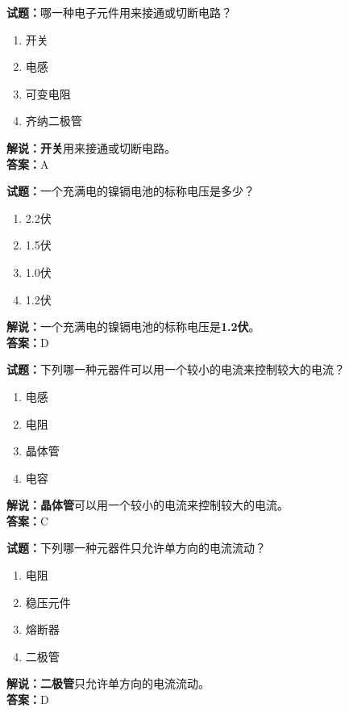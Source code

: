 \documentclass{ctexbook}
\begin{document}
\bigskip


\noindent\textbf{试题：}哪一种电子元件用来接通或切断电路？
\begin{enumerate}[leftmargin=3em]
\item 开关
\item 电感
\item 可变电阻
\item 齐纳二极管
\end{enumerate}
\noindent\textbf{解说：}\textbf{开关}用来接通或切断电路。\\\noindent\textbf{答案：}A


\bigskip


\noindent\textbf{试题：}一个充满电的镍镉电池的标称电压是多少？
\begin{enumerate}[leftmargin=3em]
\item 2.2伏
\item 1.5伏
\item 1.0伏
\item 1.2伏
\end{enumerate}
\noindent\textbf{解说：}一个充满电的镍镉电池的标称电压是\textbf{1.2伏}。\\\noindent\textbf{答案：}D



\bigskip


\noindent\textbf{试题：}下列哪一种元器件可以用一个较小的电流来控制较大的电流？
\begin{enumerate}[leftmargin=3em]
\item 电感
\item 电阻
\item 晶体管
\item 电容
\end{enumerate}
\noindent\textbf{解说：}\textbf{晶体管}可以用一个较小的电流来控制较大的电流。\\\noindent\textbf{答案：}C



\bigskip


\noindent\textbf{试题：}下列哪一种元器件只允许单方向的电流流动？
\begin{enumerate}[leftmargin=3em]
\item 电阻
\item 稳压元件
\item 熔断器
\item 二极管
\end{enumerate}
\noindent\textbf{解说：}\textbf{二极管}只允许单方向的电流流动。\\\noindent\textbf{答案：}D
\end{document}
